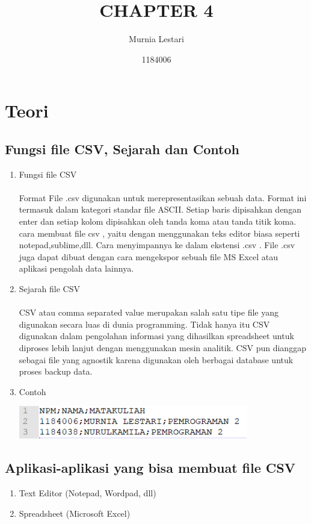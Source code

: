 \documentclass{article}
\title{CHAPTER 4}
\author{Murnia Lestari  }
\date{1184006}
\begin{document}
\maketitle

\section{Teori}
\subsection{Fungsi file CSV, Sejarah dan Contoh}
        \begin{enumerate}
            \item Fungsi file CSV
                \paragraph{}Format File .csv digunakan untuk merepresentasikan sebuah data. Format ini termasuk dalam kategori standar file ASCII. Setiap baris dipisahkan dengan enter dan setiap kolom dipisahkan oleh tanda koma atau tanda titik koma. cara membuat file csv , yaitu dengan menggunakan teks editor biasa seperti notepad,sublime,dll. Cara menyimpannya ke dalam ekstensi .csv . File .csv juga dapat dibuat dengan cara mengekspor sebuah file MS Excel atau aplikasi pengolah data lainnya.
            \item Sejarah file CSV
                \paragraph{} CSV atau comma separated value merupakan salah satu tipe file yang digunakan secara luas di dunia programming. Tidak hanya itu CSV  digunakan dalam pengolahan informasi yang dihasilkan spreadsheet untuk diproses lebih lanjut dengan menggunakan mesin analitik. CSV pun dianggap sebagai file yang agnostik karena digunakan oleh berbagai database untuk proses backup data.
            \newpage
            \item Contoh 
               \centerline{\includegraphics[width=10cm]{figure/0.PNG}} 
        \end{enumerate}
    
    \subsection {Aplikasi-aplikasi yang bisa membuat file CSV}
        \begin{enumerate}
            \item Text Editor (Notepad, Wordpad, dll)
            \item Spreadsheet (Microsoft Excel)
        \end{enumerate}
        
\end{document}
